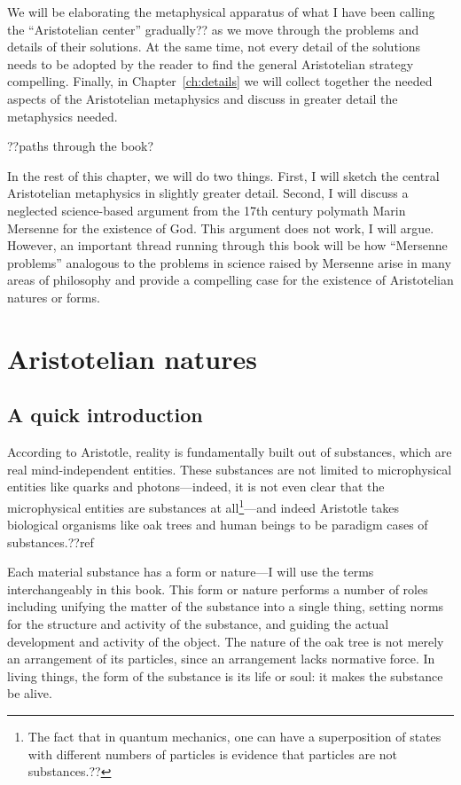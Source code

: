 We will be elaborating the metaphysical apparatus of what I have been calling the ``Aristotelian center'' gradually??
as we move through the problems and details of their solutions. At the same time, not every detail of the solutions needs to be
adopted by the reader to find the general Aristotelian strategy compelling. Finally, in Chapter~\ref{ch:details} we will
collect together the needed aspects of the Aristotelian metaphysics and discuss in greater detail the metaphysics needed.

??paths through the book?

In the rest of this chapter, we will do two things. First, I will sketch the central Aristotelian metaphysics in slightly
greater detail. Second, I will discuss a neglected science-based argument from the 17th century polymath Marin Mersenne for the existence 
of God. This argument does not work, I will argue. However, an important thread running through this book will be how ``Mersenne 
problems'' analogous to the problems in science raised by Mersenne arise in many areas of philosophy and provide a compelling 
case for the existence of Aristotelian natures or forms.

\section{Aristotelian natures}
\subsection{A quick introduction}
According to Aristotle, reality is fundamentally built out of substances, which are real mind-independent entities.
These substances are not limited to microphysical entities like quarks and photons---indeed,
it is not even clear that the microphysical entities are substances at all\footnote{The fact that in quantum mechanics, 
one can have a superposition of states with different numbers of particles is evidence that particles are not substances.??}---and
indeed Aristotle takes biological organisms like oak trees and human beings to be paradigm cases of substances.??ref

Each material substance has a form or nature---I will use the terms interchangeably in this book. This form or nature performs a number of roles including unifying the matter of the 
substance into a single thing, setting norms for the structure and activity of the substance, and guiding the actual 
development and activity of the object. The nature of the oak tree is not merely an arrangement of its particles, since an
arrangement lacks normative force. In living things, the form of the substance is its life or soul: it makes the substance
be alive. 

